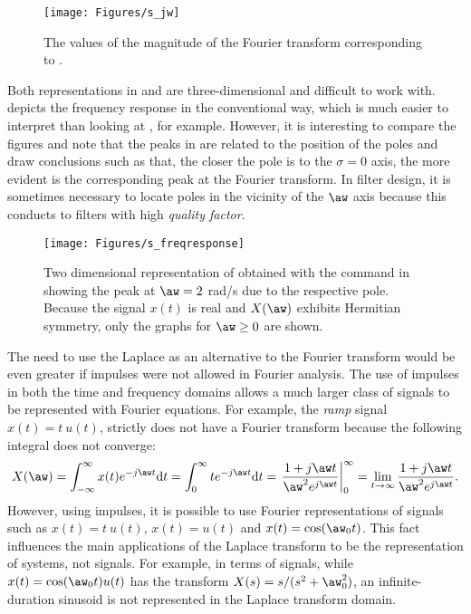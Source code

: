 \begin{figure}[!htb]
        \centering
                \texttt{[image: Figures/s\_jw]}        
        \caption{The values of the magnitude of the Fourier transform corresponding to .\label{fig:s_jw}}
\end{figure}

Both representations in  and  are three-dimensional and difficult to work with.
 depicts the frequency response in the conventional way, which is much easier to interpret than looking at , for example. However, it is interesting to compare the figures and note that the peaks in  are related to the position of the poles and draw conclusions such as that, the closer the pole is to the $\sigma=0$ axis, the more evident is the corresponding peak at the Fourier transform. In filter design, it is sometimes necessary to locate poles in the vicinity of the $\aw$ axis because this conducts to filters with high \emph{quality factor}.

\begin{figure}[!htb]
        \centering
                \texttt{[image: Figures/s\_freqresponse]}              
        \caption[{Two dimensional representation of  obtained with the command  in {\matlab} showing the peak at $\aw=2$ rad/s due to the respective pole.}]{Two dimensional representation of  obtained with the command  in {\matlab} showing the peak at $\aw=2$ rad/s due to the respective pole. Because the signal $x(t)$ is real and $X(\aw)$ exhibits Hermitian symmetry, only the graphs for $\aw \ge 0$ are shown.\label{fig:s_freqresponse}}
\end{figure}

The need to use the Laplace as an alternative to the Fourier transform would be even greater if impulses were not allowed in Fourier analysis.
The use of impulses in both the time and frequency domains allows a much larger class of signals to be represented with Fourier equations.
For example,
the \emph{ramp} signal $x(t)=t~u(t)$, strictly does not have a Fourier transform because the following integral does not converge:
\[
X(\aw) = \int_{-\infty}^\infty x(t) e^{- j \aw t} \textrm{d}t = \int_{0}^\infty t e^{- j \aw t} \textrm{d}t =
\left. \frac{1+j \aw t}{\aw^2  e^{j \aw t}} \right|_{0}^{\infty} =
\lim_{t \rightarrow \infty} \frac{1+j \aw t}{\aw^2  e^{j \aw t}}.
\]
However, using impulses, it is possible to use Fourier representations of signals such as $x(t)=t~u(t)$, $x(t)=u(t)$ and $x(t)=\cos(\aw_0 t)$. This fact influences the main applications of the Laplace transform to be the representation of systems, not signals. For example, in terms of signals, while $x(t) = \cos (\aw_0 t) u(t)$ has the transform $X(s) = s/(s^2 + \aw_0^2)$, an infinite-duration sinusoid is not represented in the Laplace transform domain.

